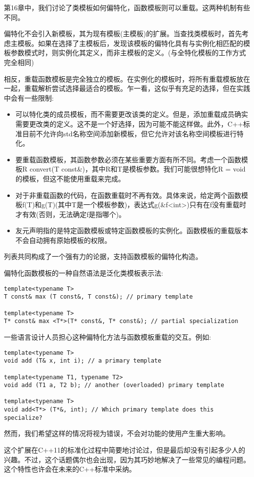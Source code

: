 
第16章中，我们讨论了类模板如何偏特化，函数模板则可以重载。这两种机制有些不同。

偏特化不会引入新模板，其为现有模板(主模板)的扩展。当查找类模板时，首先考虑主模板。如果在选择了主模板后，发现该模板的偏特化具有与实例化相匹配的模板参数模式时，则实例化其定义，而非主模板的定义。(与全特化模板的工作方式完全相同)

相反，重载函数模板是完全独立的模板。在实例化的模板时，将所有重载模板放在一起，重载解析尝试选择最适合的模板。乍一看，这似乎有充足的选择，但在实践中会有一些限制:

\begin{itemize}
\item 
可以特化类的成员模板，而不需要更改该类的定义。但是，添加重载成员确实需要更改类的定义。这不是一个好选择，因为可能不能这样做。此外，C++标准目前不允许向std名称空间添加新模板，但它允许对该名称空间模板进行特化。

\item 
要重载函数模板，其函数参数必须在某些重要方面有所不同。考虑一个函数模板R convert(T const\&)，其中R和T是模板参数。我们可能很想特化R = void的模板，但这不能使用重载来完成。

\item 
对于非重载函数的代码，在函数重载时不再有效。具体来说，给定两个函数模板f(T)和g(T)(其中T是一个模板参数)，表达式g(\&f<int>)只有在f没有重载时才有效(否则，无法确定f是指哪个)。

\item 
友元声明指的是特定函数模板或特定函数模板的实例化。函数模板的重载版本不会自动拥有原始模板的权限。
\end{itemize}

列表共同构成了一个强有力的论据，支持函数模板的偏特化构造。

偏特化函数模板的一种自然语法是泛化类模板表示法:

\begin{lstlisting}[style=styleCXX]
template<typename T>
T const& max (T const&, T const&); // primary template

template<typename T>
T* const& max <T*>(T* const&, T* const&); // partial specialization
\end{lstlisting}

一些语言设计人员担心这种偏特化方法与函数模板重载的交互。例如:

\begin{lstlisting}[style=styleCXX]
template<typename T>
void add (T& x, int i); // a primary template

template<typename T1, typename T2>
void add (T1 a, T2 b); // another (overloaded) primary template

template<typename T>
void add<T*> (T*&, int); // Which primary template does this specialize?
\end{lstlisting}

然而，我们希望这样的情况将视为错误，不会对功能的使用产生重大影响。

这个扩展在C++11的标准化过程中简要地讨论过，但是最后却没有引起多少人的兴趣。不过，这个话题偶尔也会出现，因为其巧妙地解决了一些常见的编程问题。这个特性也许会在未来的C++标准中采纳。






















